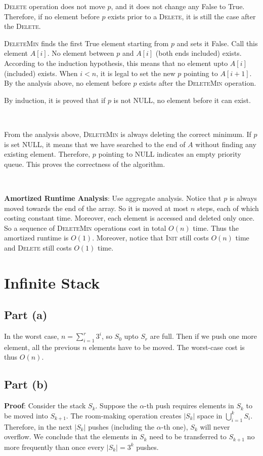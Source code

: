 \documentclass{article}
\begin{document}
\textsc{Delete} operation does not move $p$, and it does not change any False to True. Therefore, if no element before $p$ exists prior to a \textsc{Delete}, it is still the case after the \textsc{Delete}.

\textsc{DeleteMin} finds the first True element starting from $p$ and sets it False. Call this element $A[i]$. No element between $p$ and $A[i]$ (both ends included) exists. According to the induction hypothesis, this means that no element upto $A[i]$ (included) exists. When $i<n$, it is legal to set the new $p$ pointing to $A[i+1]$. By the analysis above, no element before $p$ exists after the \textsc{DeleteMin} operation.

By induction, it is proved that if $p$ is not NULL, no element before it can exist.


~

From the analysis above, \textsc{DeleteMin} is always deleting the correct minimum. If $p$ is set NULL, it means that we have searched to the end of $A$ without finding any existing element. Therefore, $p$ pointing to NULL indicates an empty priority queue. This proves the correctness of the algorithm.

~

\noindent\textbf{Amortized Runtime Analysis}:
Use aggregate analysis. Notice that $p$ is always moved towards the end of the array. So it is moved at most $n$ steps, each of which costing constant time. Moreover, each element is accessed and deleted only once. So a sequence of \textsc{DeleteMin} operations cost in total $O(n)$ time. Thus the amortized runtime is $O(1)$. Moreover, notice that \textsc{Init} still costs $O(n)$ time and \textsc{Delete} still costs $O(1)$ time.

\section{Infinite Stack}
\subsection{Part (a)}
\noindent In the worst case, $n=\sum_{i=1}^r3^i$, so $S_0$ upto $S_r$ are full. Then if we push one more element, all the previous $n$ elements have to be moved. The worst-case cost is thus $O(n)$.

\subsection{Part (b)}
\noindent\textbf{Proof}:
Consider the stack $S_k$. Suppose the $\alpha$-th push requires elements in $S_k$ to be moved into $S_{k+1}$. The room-making operation creates $|S_k|$ space in $\bigcup_{i=1}^kS_i$. Therefore, in the next $|S_k|$ pushes (including the $\alpha$-th one), $S_k$ will never overflow. We conclude that the elements in $S_k$ need to be transferred to $S_{k+1}$ no more frequently than once every $|S_k|=3^k$ pushes.
\end{document}

